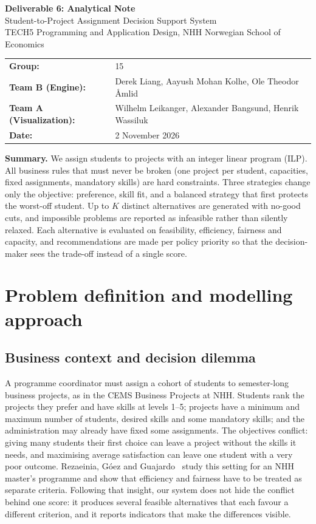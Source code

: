 \documentclass[11pt,a4paper]{article}
\begin{document}
\begin{center}
{\LARGE\bfseries Deliverable 6: Analytical Note}\\[4pt]
{\large Student-to-Project Assignment Decision Support System}\\[10pt]
TECH5 Programming and Application Design, NHH Norwegian School of Economics\\[8pt]
\begin{tabular}{ll}
\textbf{Group:} & 15\\
\textbf{Team B (Engine):} & Derek Liang, Aayush Mohan Kolhe, Ole Theodor Åmlid\\
\textbf{Team A (Visualization):} & Wilhelm Leikanger, Alexander Bangsund, Henrik Wassiluk\\
\textbf{Date:} & 2 November 2026
\end{tabular}
\end{center}

\vspace{6pt}
\noindent\textbf{Summary.}
We assign students to projects with an integer linear program (ILP). All
business rules that must never be broken (one project per student, capacities,
fixed assignments, mandatory skills) are hard constraints. Three strategies
change only the objective: preference, skill fit, and a balanced strategy that
first protects the worst-off student. Up to $K$ distinct alternatives are
generated with no-good cuts, and impossible problems are reported as
infeasible rather than silently relaxed. Each alternative is evaluated on
feasibility, efficiency, fairness and capacity, and recommendations are made
per policy priority so that the decision-maker sees the trade-off instead of a
single score.

\section{Problem definition and modelling approach}

\subsection{Business context and decision dilemma}

A programme coordinator must assign a cohort of students to semester-long
business projects, as in the CEMS Business Projects at NHH. Students rank the
projects they prefer and have skills at levels 1--5; projects have a minimum
and maximum number of students, desired skills and some mandatory skills; and
the administration may already have fixed some assignments. The objectives
conflict: giving many students their first choice can leave a project without
the skills it needs, and maximising average satisfaction can leave one student
with a very poor outcome. Rezaeinia, G\'oez and Guajardo~\cite{rezaeinia2022}
study this setting for an NHH master's programme and show that efficiency and
fairness have to be treated as separate criteria. Following that insight, our
system does not hide the conflict behind one score: it produces several
feasible alternatives that each favour a different criterion, and it reports
indicators that make the differences visible.
\end{document}
